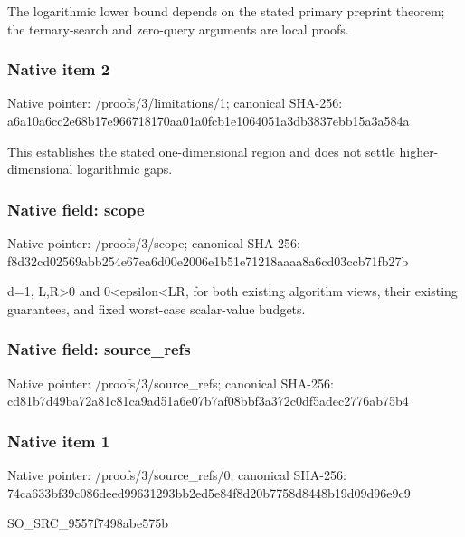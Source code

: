 \documentclass[10pt,a4paper]{article}
\begin{document}
\begingroup\raggedright\sloppy The logarithmic lower bound depends on the stated primary preprint theorem;\allowbreak{} the ternary-search and zero-query arguments are local proofs.\par\endgroup

\subsubsection{Native item 2}
Native pointer: /proofs/3/limitations/1; canonical SHA-256: a6a10a6cc2e68b17e966718170aa01a0fcb1e1064051a3db3837ebb15a3a584a

\begingroup\raggedright\sloppy This establishes the stated one-dimensional region and does not settle higher-dimensional logarithmic gaps.\par\endgroup

\subsubsection{Native field: scope}
Native pointer: /proofs/3/scope; canonical SHA-256: f8d32cd02569abb254e67ea6d00e2006e1b51e71218aaaa8a6cd03ccb71fb27b

\begingroup\raggedright\sloppy d=\allowbreak{}1,\allowbreak{} L,\allowbreak{}R>0 and 0<epsilon<LR,\allowbreak{} for both existing algorithm views,\allowbreak{} their existing guarantees,\allowbreak{} and fixed worst-case scalar-value budgets.\par\endgroup

\subsubsection{Native field: source\_\allowbreak{}refs}
Native pointer: /proofs/3/source\_\allowbreak{}refs; canonical SHA-256: cd81b7d49ba72a81c81ca9ad51a6e07b7af08bbf3a372c0df5adec2776ab75b4

\subsubsection{Native item 1}
Native pointer: /proofs/3/source\_\allowbreak{}refs/0; canonical SHA-256: 74ca633bf39c086deed99631293bb2ed5e84f8d20b7758d8448b19d09d96e9c9

\begingroup\raggedright\sloppy SO\_\allowbreak{}SRC\_\allowbreak{}9557f7498abe575b\par\endgroup
\end{document}
